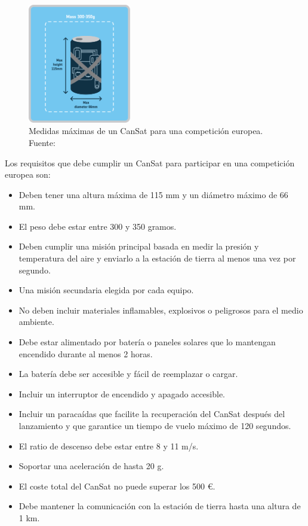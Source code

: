\begin{figure}
    \centering
    \includegraphics[width=0.4\textwidth]{Imagenes/Bitmap/cansat_size}
    \caption{Medidas máximas de un CanSat para una competición europea. Fuente: \cite{esa_cansat_project}}
    \label{fig:cansat_Size}
\end{figure}

Los requisitos que debe cumplir un CanSat para participar en una competición europea son:
\begin{itemize}
    \item Deben tener una altura máxima de 115 mm y un diámetro máximo de 66 mm.
    \item El peso debe estar entre 300 y 350 gramos.
    \item Deben cumplir una misión principal basada en medir la presión y temperatura del aire y enviarlo a la estación de tierra al menos una vez por segundo.
    \item Una misión secundaria elegida por cada equipo.
    \item No deben incluir materiales inflamables, explosivos o peligrosos para el medio ambiente.
    \item Debe estar alimentado por batería o paneles solares que lo mantengan encendido durante al menos 2 horas.
    \item La batería debe ser accesible y fácil de reemplazar o cargar.
    \item Incluir un interruptor de encendido y apagado accesible.
    \item Incluir un paracaídas que facilite la recuperación del CanSat después del lanzamiento y que garantice un tiempo de vuelo máximo de 120 segundos.
    \item El ratio de descenso debe estar entre 8 y 11 m/s.
    \item Soportar una aceleración de hasta 20 g.
    \item El coste total del CanSat no puede superar los 500 \euro.
    \item Debe mantener la comunicación con la estación de tierra hasta una altura de 1 km.
\end{itemize}


